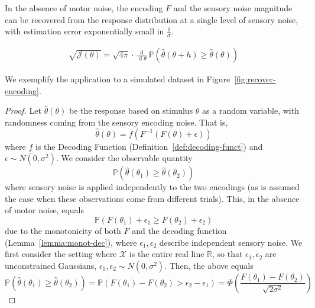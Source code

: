 \begin{thm}\label{lemma:f-exact}
    In the absence of motor noise, the encoding $F$ and the sensory noise magnitude can be recovered from the response distribution at a single level of sensory noise, with estimation error exponentially small in $\frac{1}{\sigma}$. 

\begin{align*}
 \sqrt{\mathcal{J}(\theta)} = \sqrt{4\pi} \cdot \frac{\operatorname{d}}{\operatorname{d}\theta} \mathbb{P}(\widehat{\theta}(\theta+h) \geq \widehat{\theta}(\theta)) 
\end{align*}
    
\end{thm}
We exemplify the application to a simulated dataset in Figure~\ref{fig:recover-encoding}.
\begin{proof}
    Let $\widehat{\theta}(\theta)$ be the response based on stimulus $\theta$ as a random variable, with randomness coming from the sensory encoding noise.
    That is,
    \begin{equation}
        \widehat{\theta}(\theta) = f(F^{-1}(F(\theta) + \epsilon))
    \end{equation}
    where $f$ is the Decoding Function (Definition~\ref{def:decoding-funct}) and $\epsilon \sim N(0,\sigma^2)$.
    We consider the observable quantity
\begin{equation}
\mathbb{P}\left(\widehat{\theta}(\theta_1) \geq \widehat{\theta}(\theta_2)\right)
\end{equation}
where sensory noise is applied independently to the two encodings (as is assumed the case when these observations come from different trials).
This, in the absence of motor noise, equals
\begin{equation}
\mathbb{P}\left(F(\theta_1) + \epsilon_1 \geq F(\theta_2) + \epsilon_2\right)
\end{equation}
due to the monotonicity of both $F$ and the decoding function (Lemma~\ref{lemma:monot-dec}), where $\epsilon_1, \epsilon_2$ describe independent sensory noise.
We first consider the setting where $\mathcal{X}$ is the entire real line $\mathbb{R}$, so that $\epsilon_1, \epsilon_2$ are unconstrained Gaussians, $\epsilon_1, \epsilon_2 \sim N(0,\sigma^2)$.
Then, the above equals
\begin{equation}\label{eq:comparison-encodings-cumulative}
\mathbb{P}\left(\widehat{\theta}(\theta_1) \geq \widehat{\theta}(\theta_2)\right) = \mathbb{P}\left(F(\theta_1) - F(\theta_2) > \epsilon_2-\epsilon_1\right) = \Phi\left(\frac{F(\theta_1) - F(\theta_2)}{\sqrt{2\sigma^2}}\right)

\end{equation}
\end{proof}

